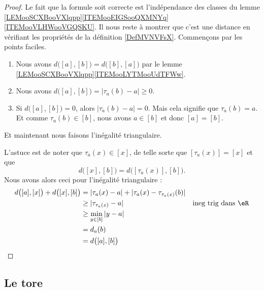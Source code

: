 \begin{proof}
	Le fait que la formule soit correcte est l'indépendance des classes du lemme \ref{LEMooSCXBooVXlqpp}\ref{ITEMooEIGSooQXMNYq}\ref{ITEMooVLHWooVGQSKU}. Il nous reste à montrer que c'est une distance en vérifiant les propriétés de la définition \ref{DefMVNVFsX}. Commençons par les points faciles.
	\begin{enumerate}
		\item
		      Nous avons \( d\big( [a],[b] \big)=d\big( [b],[a] \big)\) par le lemme \ref{LEMooSCXBooVXlqpp}\ref{ITEMooLYTMooUdTFWw}.
		\item
		      Nous avons \( d\big( [a],[b] \big)=| \tau_a(b)-a |\geq 0\).
		\item
		      Si \( d\big( [a],[b] \big)=0\), alors \( | \tau_a(b)-a |=0\). Mais cela signifie que \( \tau_a(b)=a\). Et comme \( \tau_a(b)\in [b]\), nous avons \( a\in [b]\) et donc \( [a]=[b]\).
	\end{enumerate}
	Et maintenant nous faisons l'inégalité triangulaire.

	L'astuce est de noter que \( \tau_a(x)\in[x]\), de telle sorte que \( [\tau_a(x)]=[x]\) et que
	\begin{equation}
		d\big( [x],[b] \big)=d\big( [\tau_a(x)],[b] \big).
	\end{equation}
	Nous avons alors ceci pour l'inégalité triangulaire :
	\begin{subequations}
		\begin{align}
			d\big( [a],[x] \big)+d\big( [x],[b] \big) & =| \tau_a(x)-a |+| \tau_a(x)-\tau_{\tau_a(x)}(b) |                                  \\
			                                          & \geq | \tau_{\tau_a(x)}-a |                        & \text{ineg trig dans \( \eR\)} \\
			                                          & \geq\min_{y\in[b]}| y-a |                                                           \\
			                                          & =d_a(b)                                                                             \\
			                                          & =d\big( [a],[b] \big)
		\end{align}
	\end{subequations}
\end{proof}

\subsection{Le tore}
\label{SUBSECooZVJPooCBqBuk}



